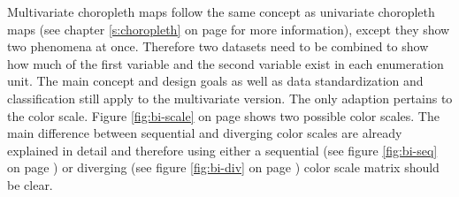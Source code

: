 Multivariate choropleth maps follow the same concept as univariate choropleth maps (see chapter \ref{s:choropleth} on page \pageref{s:choropleth} for more information), except they show two phenomena at once. Therefore two datasets need to be combined to show how much of the first variable and the second variable exist in each enumeration unit. The main concept and design goals as well as data standardization and classification still apply to the multivariate version. The only adaption pertains to the color scale. Figure \ref{fig:bi-scale} on page \pageref{fig:bi-scale} shows two possible color scales. The main difference between sequential and diverging color scales are already explained in detail and therefore using either a sequential (see figure \ref{fig:bi-seq} on page \pageref{fig:bi-seq}) or diverging (see figure \ref{fig:bi-div} on page \pageref{fig:bi-div}) color scale matrix should be clear.


